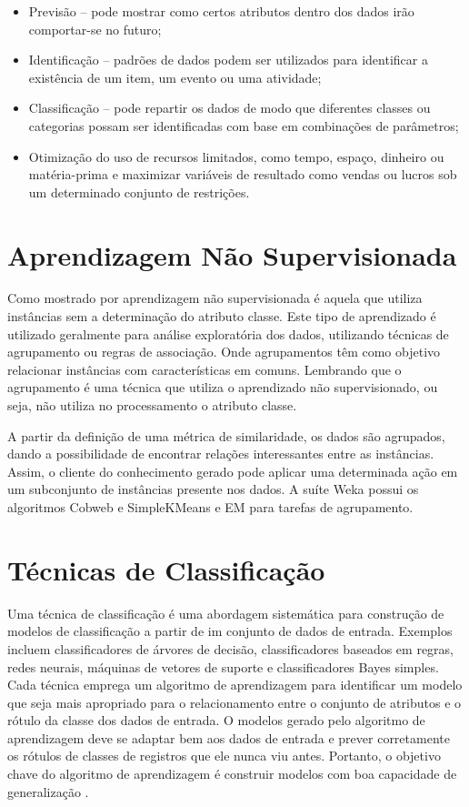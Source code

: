 \documentclass[
	12pt,				%
	openright,			%
	oneside,	
	a4paper,				%
	english,				%
	brazil				%
]{abntex2/abntex2} %
\begin{document}
		\begin{itemize}
			\item Previsão – pode mostrar como certos atributos dentro dos dados irão comportar-se no futuro;
			\item Identificação – padrões de dados podem ser utilizados para identificar a existência de um item, um evento ou uma atividade;
			\item Classificação – pode repartir os dados de modo que diferentes classes ou categorias possam ser identificadas com base em combinações de parâmetros;
			\item Otimização do uso de recursos limitados, como tempo, espaço, dinheiro ou matéria-prima e maximizar variáveis de resultado como vendas ou lucros sob um determinado conjunto de restrições.
		\end{itemize}
		
	\section{Aprendizagem Não Supervisionada}
	
		Como mostrado por \cite{damasceno:2005} aprendizagem não supervisionada é aquela que utiliza instâncias sem a determinação do atributo classe. Este  tipo de aprendizado é utilizado geralmente para análise exploratória dos dados, utilizando técnicas de  agrupamento ou regras de associação. Onde agrupamentos têm como objetivo relacionar instâncias com características em comuns. Lembrando que o agrupamento é uma técnica que utiliza o aprendizado não supervisionado, ou seja, não utiliza no  processamento o atributo classe.
		
		A partir da definição de uma métrica de similaridade, os dados são  agrupados, dando a possibilidade de encontrar relações interessantes entre as instâncias. Assim, o cliente do conhecimento gerado pode aplicar uma determinada ação em um subconjunto de instâncias presente nos  dados. A suíte Weka possui os algoritmos Cobweb e SimpleKMeans e EM para tarefas de agrupamento.
		
	\section{Técnicas de Classificação}
	
	Uma técnica de classificação é uma abordagem sistemática para construção de modelos de classificação a partir de im conjunto de dados de entrada. Exemplos incluem classificadores de árvores de decisão, classificadores baseados em regras, redes neurais, máquinas de vetores de suporte e classificadores Bayes simples. Cada técnica emprega um algoritmo de aprendizagem para identificar um modelo que seja mais apropriado para o relacionamento entre o conjunto de atributos e o rótulo da classe dos dados de entrada. O modelos gerado pelo algoritmo de aprendizagem deve se adaptar bem aos dados de entrada e prever corretamente os rótulos de classes de registros que ele nunca viu antes. Portanto, o objetivo chave do algoritmo de aprendizagem é construir modelos com boa capacidade de generalização \cite{tan:2009}.
	
\end{document}
